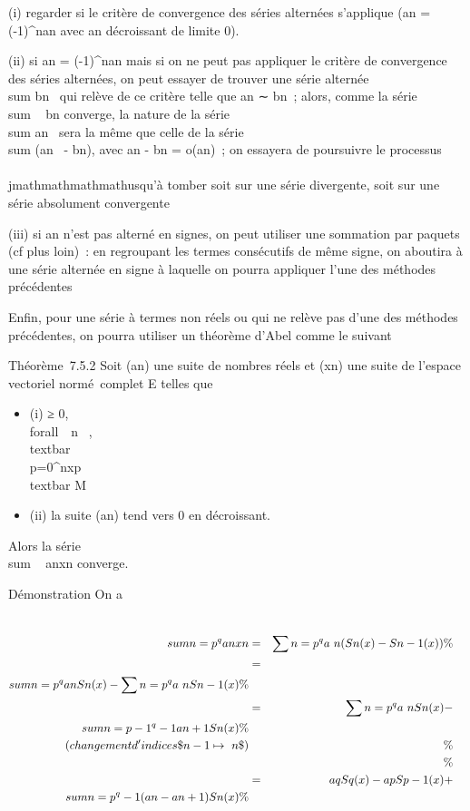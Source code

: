 (i) regarder si le critère de convergence des séries alternées
s'applique (an =
(-1)^n\textbar{}an\textbar{} avec
\textbar{}an\textbar{} décroissant de limite 0).

(ii) si an = (-1)^n\textbar{}an\textbar{}
mais si on ne peut pas appliquer le critère de convergence des séries
alternées, on peut essayer de trouver une série alternée
\\sum  bn~ qui
relève de ce critère telle que an ∼ bn~; alors,
comme la série \\sum ~
bn converge, la nature de la série
\\sum  an~ sera
la même que celle de la série
\\sum  (an~ -
bn), avec an - bn = o(an)~; on
essayera de poursuivre le processus \\\\jmathmathmathmathusqu'à tomber soit sur une série
divergente, soit sur une série absolument convergente

(iii) si an n'est pas alterné en signes, on peut utiliser une
sommation par paquets (cf plus loin)~: en regroupant les termes
consécutifs de même signe, on aboutira à une série alternée en signe à
laquelle on pourra appliquer l'une des méthodes précédentes

Enfin, pour une série à termes non réels ou qui ne relève pas d'une des
méthodes précédentes, on pourra utiliser un théorème d'Abel comme le
suivant

Théorème~7.5.2 Soit (an) une suite de nombres réels et
(xn) une suite de l'espace vectoriel normé~complet E telles
que

\begin{itemize}
\itemsep1pt\parskip0pt
\item
  (i) \existsM ≥ 0, \\forall~~n \in
  ~,
  \\textbar{}\\\sum
   p=0^nxp\\textbar{} \leq M
\item
  (ii) la suite (an) tend vers 0 en décroissant.
\end{itemize}

Alors la série \\sum ~
anxn converge.

Démonstration On a

\begin{align*} \\sum
n=p^qa nxn& =&
\sum n=p^qa~
n(Sn(x) - Sn-1(x)) \%&
\\ & =& \\sum
n=p^qa nSn(x)
-\sum n=p^qa~
nSn-1(x) \%& \\ & =&
\sum n=p^qa~
nSn(x) -\\sum
n=p-1^q-1a n+1Sn(x) \%&
\\ \text (changement
d'indices \$n - 1\mapsto~n\$)&& \%&
\\ & & \%&
\\ & =& aqSq(x) -
apSp-1(x) + \\sum
n=p^q-1(a n -
an+1)Sn(x)\%& \\
\end{align*}

